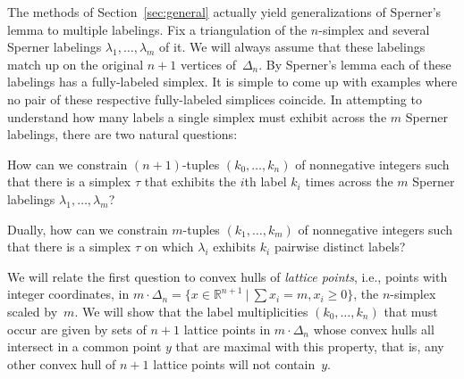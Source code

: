 \documentclass[a4paper,10pt,reqno, english]{amsart}
\theoremstyle{plain}
\theoremstyle{definition}
\newcommand{\R}{\mathbb{R}}
\begin{document}
The methods of Section~\ref{sec:general} actually yield generalizations of Sperner's lemma to multiple labelings.
Fix a triangulation of the $n$-simplex and several Sperner labelings $\lambda_1, \dots, \lambda_m$ of it. 
We will always assume that these labelings match up on the original $n+1$ vertices of~$\Delta_n$. By Sperner's lemma each of these
labelings has a fully-labeled simplex. It is simple to come up with examples where no pair of these respective fully-labeled simplices coincide. 
In attempting to understand how many labels a single simplex must exhibit across the $m$ Sperner labelings, there are two natural
questions:
\begin{compactenum}[1.]
	\item \label{item:primal}
	How can we constrain $(n+1)$-tuples $(k_0, \dots, k_n)$ of nonnegative integers such that there is a simplex $\tau$ that exhibits
	the $i$th label $k_i$ times across the $m$ Sperner labelings $\lambda_1, \dots, \lambda_m$? 
	\item \label{item:dual}
	Dually, how can we constrain $m$-tuples $(k_1, \dots, k_m)$ of nonnegative integers such that there is a simplex $\tau$ on which
	$\lambda_i$ exhibits $k_i$ pairwise distinct labels?
\end{compactenum}

We will relate the first question to convex hulls of \emph{lattice points}, i.e., points with integer coordinates, 
in $m \cdot \Delta_n=\{x \in \R^{n+1} \: | \: \sum x_i = m, x_i \ge 0\}$, the $n$-simplex scaled by~$m$.
We will show that the label multiplicities $(k_0, \dots, k_n)$ that must occur are given by sets of $n+1$ 
lattice points in $m \cdot \Delta_n$ whose convex hulls all intersect in a common point $y$ that are maximal 
with this property, that is, any other convex hull of $n+1$ lattice points will not contain~$y$.
\end{document}
